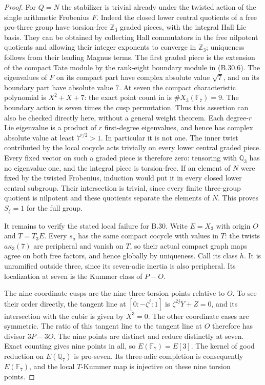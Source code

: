 \begin{proof}
For $Q=N$ the stabilizer is trivial already under the
twisted action of the single arithmetic Frobenius $F$.
Indeed the closed lower central quotients of a free
pro-three group have torsion-free $\mathbb Z_3$ graded
pieces, with the integral Hall Lie basis.
They can be obtained by collecting Hall commutators
in the free nilpotent quotients and allowing their
integer exponents to converge in $\mathbb Z_3$;
uniqueness follows from their leading Magnus terms.
The first graded piece is the extension of the compact
Tate module by the rank-eight boundary module in
(B.30.6).  The eigenvalues of $F$ on its compact
part have complex absolute value $\sqrt7$, and on
its boundary part have absolute value $7$.
At seven the compact characteristic polynomial is
$X^2+X+7$: the exact point count in
 is $\#X_3(\mathbb F_7)=9$.
The boundary action is seven times the cusp permutation.
Thus this assertion can also be checked directly here,
without a general weight theorem.
Each degree-$r$ Lie eigenvalue is a product of $r$
first-degree eigenvalues, and hence has complex absolute
value at least $7^{r/2}>1$.
In particular it is not one.
The inner twist contributed by the local cocycle acts
trivially on every lower central graded piece.
Every fixed vector on such a graded piece is therefore
zero: tensoring with $\mathbb Q_3$ has no eigenvalue one,
and the integral piece is torsion-free.
If an element of $N$ were fixed by the twisted Frobenius,
induction would put it in every closed lower central
subgroup.  Their intersection is trivial, since every
finite three-group quotient is nilpotent and these
quotients separate the elements of $N$.
This proves $S_\xi=1$ for the full group.

It remains to verify the stated local failure for B.30.
Write $E=X_3$ with origin $O$ and $T=T_3E$.
Every $s_a$ has the same compact cocycle with values in
$T$: the twists $a\kappa_3(7)$ are peripheral and vanish
on $T$, so their actual compact graph maps agree on both
free factors, and hence globally by uniqueness.
Call its class $h$.  It is unramified outside three,
since its seven-adic inertia is also peripheral.
Its localization at seven is the Kummer class of $P-O$.

The nine coordinate cusps are the nine three-torsion
points relative to $O$.  To see their order directly,
the tangent line at $[0:-\zeta^j:1]$ is
$\zeta^{2j}Y+Z=0$, and its intersection with the cubic
is given by $X^3=0$.  The other coordinate cases are
symmetric.  The ratio of this tangent line to the
tangent line at $O$ therefore has divisor $3P-3O$.
The nine points are distinct and reduce distinctly at
seven.  Exact counting gives nine points in all, so
$E(\mathbb F_7)=E[3]$.
The kernel of good reduction on $E(\mathbb Q_7)$ is
pro-seven.  Its three-adic completion is consequently
$E(\mathbb F_7)$, and the local $T$-Kummer map is
injective on these nine torsion points.


\end{proof}
